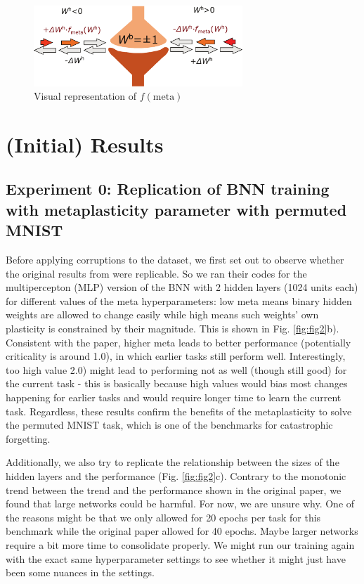 \documentclass[manuscript,screen,review]{acmart}
\begin{document}
\begin{figure}[ht]
    \centering
    \includegraphics[width=0.7\textwidth]{figures/report/Fig1.pdf}
    \caption{Visual representation of \(f(\text{meta})\)}
    \label{fig:fig1}
\end{figure}

\section{(Initial) Results}
\subsection{Experiment 0: Replication of BNN training with metaplasticity parameter with permuted MNIST
}

Before applying corruptions to the dataset, we first set out to observe whether the original results from \cite{Laborieux_Ernoult_Hirtzlin_Querlioz_2021} were replicable. So we ran their codes for the multipercepton (MLP) version of the BNN with 2 hidden layers (1024 units each) for different values of the meta hyperparameters: low meta means binary hidden weights are allowed to change easily while high means such weights’ own plasticity is constrained by their magnitude. This is shown in Fig. \ref{fig:fig2}b). Consistent with the paper, higher meta leads to better performance (potentially criticality is around 1.0), in which earlier tasks still perform well. Interestingly, too high value 2.0) might lead to performing not as well (though still good) for the current task - this is basically because high values would bias most changes happening for earlier tasks and would require longer time to learn the current task. Regardless, these results confirm the benefits of the metaplasticity to solve the permuted MNIST task, which is one of the benchmarks for catastrophic forgetting. 

Additionally, we also try to replicate the relationship between the sizes of the hidden layers and the performance (Fig. \ref{fig:fig2}c). Contrary to the monotonic trend between the trend and the performance shown in the original paper, we found that large networks could be harmful. For now, we are unsure why. One of the reasons might be that we only allowed for 20 epochs per task for this benchmark while the original paper allowed for 40 epochs. Maybe larger networks require a bit more time to consolidate properly. We might run our training again with the exact same hyperparameter settings to see whether it might just have been some nuances in the settings. 
\end{document}
